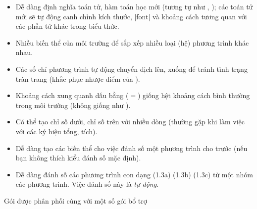 \medskip
\begin{itemize}
\item
Dễ dàng định nghĩa toán tử, hàm toán học mới (tương tự như , );
các toán tử mới sẽ tự động canh chỉnh kích thước, |font|
và khoảng cách tương quan với các phần tử khác trong biểu thức.

\item
Nhiều biến thể của môi trường 
để sắp xếp nhiều loại (hệ) phương trình khác nhau.

\item
Các số chỉ phương trình tự động chuyển dịch lên, xuống để tránh
tình trạng tràn trang (khắc phục nhược điểm của ).

\item
Khoảng cách xung quanh dấu bằng ($=$) giống hệt khoảng cách bình thường
trong môi trường  (không giống như ).

\item
Có thể tạo chỉ số dưới, chỉ số trên với nhiều dòng (thường gặp khi 
làm việc với các ký hiệu tổng, tích).

\item
Dễ dàng tạo các biến thể cho việc đánh số một phương trình cho trước
(nếu bạn không thích kiểu đánh số mặc định).

\item
Dễ dàng đánh số các phương trình con dạng (1.3a) (1.3b) (1.3c)
từ một nhóm các phương trình. Việc đánh số này là \emph{tự động.}
\end{itemize}

\medskip
Gói  được phân phối cùng với một số gói bổ trợ

